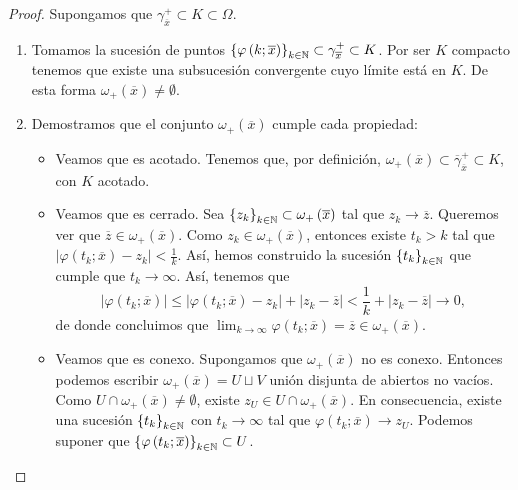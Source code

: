 \begin{proof}
Supongamos que $\displaystyle \gamma_{\overline{x}}^{+}\subset K\subset \Omega  $. 
\begin{enumerate}
	\item Tomamos la sucesión de puntos $\displaystyle \left\{ \varphi\left(k; \overline{x}\right)\right\} _{k \in \mathbb{N}}\subset \gamma^{+}_{\overline{x}}\subset K $. Por ser $\displaystyle K $ compacto tenemos que existe una subsucesión convergente cuyo límite está en $\displaystyle K $. De esta forma $\displaystyle \omega_{+}\left(\overline{x}\right)\neq \emptyset $. 
	\item Demostramos que el conjunto $\displaystyle \omega_{+}\left(\overline{x}\right) $ cumple cada propiedad:
	\begin{itemize}
	\item Veamos que es acotado. Tenemos que, por definición, $\displaystyle \omega_{+}\left(\overline{x}\right)\subset \overline{\gamma }^{+}_{\overline{x}} \subset K$, con $\displaystyle K $ acotado. 
	\item Veamos que es cerrado. Sea $\displaystyle \left\{ z_{k}\right\} _{k \in \mathbb{N}}\subset \omega_{+}\left(\overline{x}\right) $ tal que $\displaystyle z_{k}\to \overline{z} $. Queremos ver que $\displaystyle \overline{z}\in \omega_{+}\left(\overline{x}\right) $. Como $\displaystyle z_{k}\in \omega_{+}\left(\overline{x}\right) $, entonces existe $\displaystyle t_{k} > k $ tal que $\displaystyle \left|\varphi\left(t_{k}; \overline{x}\right)-z_{k}\right|<\frac{1}{k} $. 
		Así, hemos construido la sucesión $\displaystyle \left\{ t_{k}\right\} _{k \in \mathbb{N}} $ que cumple que $\displaystyle t_{k}\to \infty $. Así, tenemos que 
		\[ \left|\varphi\left(t_{k}; \overline{x}\right)\right| \leq \left|\varphi\left(t_{k}; \overline{x}\right)-z_{k}\right|+ \left|z_{k}-\overline{z}\right|< \frac{1}{k} + \left|z_{k}-\overline{z}\right|\to 0,\]
		de donde concluimos que $\displaystyle \lim_{k \to \infty}\varphi\left(t_{k}; \overline{x}\right)=\overline{z}\in \omega_{+}\left(\overline{x}\right) $. 
	\item Veamos que es conexo. Supongamos que $\displaystyle \omega_{+ }\left(\overline{x}\right) $ no es conexo. Entonces podemos escribir $\displaystyle \omega_{+}\left(\overline{x}\right)=U\sqcup V $ unión disjunta de abiertos no vacíos. Como $\displaystyle U \cap \omega_{+}\left(\overline{x}\right)\neq \emptyset $, existe $\displaystyle z_{U}\in U \cap \omega_{+}\left(\overline{x}\right) $. 
		En consecuencia, existe una sucesión $\displaystyle \left\{ t_{k}\right\} _{k\in \mathbb{N}} $ con $\displaystyle t_{k}\to \infty $ tal que $\displaystyle \varphi\left(t_{k}; \overline{x}\right)\to z_{U} $. Podemos suponer que $\displaystyle \left\{ \varphi\left(t_{k}; \overline{x}\right)\right\} _{k \in \mathbb{N}}\subset U $. 

\end{itemize}
\end{enumerate}
\end{proof}
